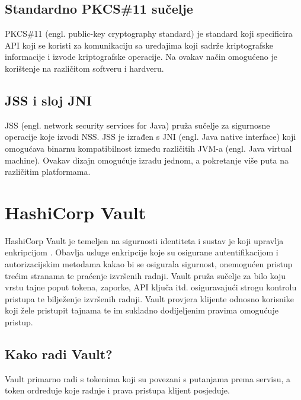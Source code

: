 \documentclass[]{foi}
\begin{document}
\subsection{Standardno PKCS\#11 sučelje}
PKCS\#11 (engl. public-key cryptography standard) je standard koji specificira API koji se koristi za komunikaciju sa uređajima koji sadrže kriptografske informacije i izvode kriptografske operacije.
Na ovakav način omogućeno je korištenje na različitom softveru i hardveru.
\subsection{JSS i sloj JNI}
JSS (engl. network security services for Java) pruža sučelje za sigurnosne operacije koje izvodi NSS.
JSS je izrađen s JNI (engl. Java native interface) koji omogućava binarnu kompatibilnost između različitih JVM-a (engl. Java virtual machine).
Ovakav dizajn omogućuje izradu jednom, a pokretanje više puta na različitim platformama.
\pagebreak
\section{HashiCorp Vault}

HashiCorp Vault je temeljen na sigurnosti identiteta i sustav je koji upravlja enkripcijom \cite{hashicorp-vault-what-is}.
Obavlja usluge enkripcije koje su osigurane autentifikacijom i autorizacijskim metodama kakao bi se osigurala sigurnost, onemogućen pristup trećim stranama te praćenje izvršenih radnji.
Vault pruža sučelje za bilo koju vrstu tajne poput tokena, zaporke, API ključa itd. osiguravajući strogu kontrolu pristupa te bilježenje izvršenih radnji.
Vault provjera klijente odnosno korisnike koji žele pristupit tajnama te im sukladno dodijeljenim pravima omogućuje pristup.

\subsection{Kako radi Vault?}

Vault primarno radi s tokenima koji su povezani s putanjama prema servisu, a token ordređuje koje radnje i prava pristupa klijent posjeduje.
\end{document}
